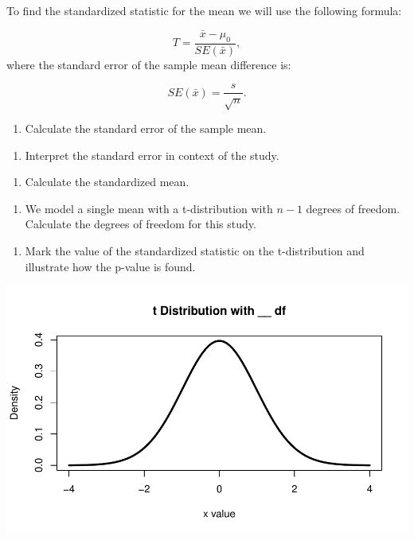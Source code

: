 \documentclass[
]{report}
\providecommand{\tightlist}{%
  \setlength{\itemsep}{0pt}\setlength{\parskip}{0pt}}
\begin{document}
To find the standardized statistic for the mean we will use the following formula:

\[T = \frac{\bar{x} - \mu_0}{SE(\bar{x})},\]
where the standard error of the sample mean difference is:

\[SE(\bar{x})=\frac{s}{\sqrt{n}}.\]

\begin{enumerate}
\def\labelenumi{\arabic{enumi}.}
\setcounter{enumi}{6}
\tightlist
\item
  Calculate the standard error of the sample mean.
\end{enumerate}

\vspace{0.5in}

\begin{enumerate}
\def\labelenumi{\arabic{enumi}.}
\setcounter{enumi}{7}
\tightlist
\item
  Interpret the standard error in context of the study.
\end{enumerate}

\vspace{1in}

\begin{enumerate}
\def\labelenumi{\arabic{enumi}.}
\setcounter{enumi}{8}
\tightlist
\item
  Calculate the standardized mean.
\end{enumerate}

\vspace{1in}

\begin{enumerate}
\def\labelenumi{\arabic{enumi}.}
\setcounter{enumi}{9}
\tightlist
\item
  We model a single mean with a t-distribution with \(n-1\) degrees of freedom. Calculate the degrees of freedom for this study.
\end{enumerate}

\vspace{0.2in}

\begin{enumerate}
\def\labelenumi{\arabic{enumi}.}
\setcounter{enumi}{10}
\tightlist
\item
  Mark the value of the standardized statistic on the t-distribution and illustrate how the p-value is found.
\end{enumerate}

\begin{center}\includegraphics[width=0.7\linewidth]{06-A13-quantitative_theory_files/figure-latex/tdistmean-1} \end{center}
\newpage
\end{document}
